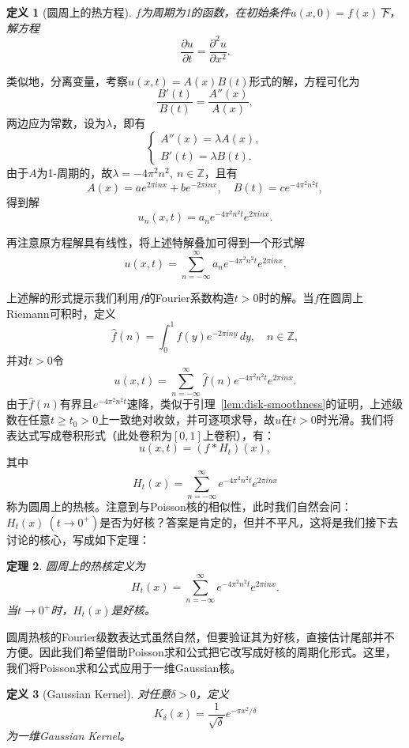 \documentclass[UTF8,zihao=5,linespread=1.34]{ctexart}
\theoremstyle{cnplain}
\newtheorem{theorem}{定理}[section]
\newtheorem{definition}[theorem]{定义}
\theoremstyle{cnremark}
\begin{document}
\begin{definition}[圆周上的热方程]
$f$为周期为1的函数，在初始条件$u(x,0) = f(x)$下，解方程
\[
\frac{\partial u}{\partial t} = \frac{\partial^{2}u}{\partial x^{2}}.
\tag{H}\label{eq:circle-heat}
\]
\end{definition}

类似地，分离变量，考察$u(x,t) = A(x)B(t)$形式的解，方程可化为
\[
\frac{B'(t)}{B(t)} = \frac{A''(x)}{A(x)},
\]
两边应为常数，设为$\lambda$，即有
\[
\begin{cases}
A''(x) = \lambda A(x), \\
B'(t) = \lambda B(t).
\end{cases}
\]
由于$A$为1-周期的，故$\lambda = -4\pi^{2}n^{2},\ n \in \mathbb{Z}$，且有
\[
A(x) = a e^{2\pi inx} + b e^{-2\pi inx},\quad B(t) = c e^{-4\pi^{2}n^{2}t},
\]
得到解
\[
u_n(x,t) = a_n e^{-4\pi^{2}n^{2}t} e^{2\pi inx}.
\]

再注意原方程解具有线性，将上述特解叠加可得到一个形式解
\[
u(x,t) = \sum_{n=-\infty}^{\infty} a_n e^{-4\pi^{2}n^{2}t} e^{2\pi inx}.
\]

上述解的形式提示我们利用$f$的Fourier系数构造$t>0$时的解。当$f$在圆周上Riemann可积时，定义
\[
\widehat{f}(n) = \int_{0}^{1} f(y)e^{-2\pi iny}\,dy,
\quad n \in \mathbb{Z},
\]
并对$t>0$令
\[
u(x,t) = \sum_{n=-\infty}^{\infty} \widehat{f}(n) e^{-4\pi^{2}n^{2}t} e^{2\pi inx}.
\]
由于$\widehat{f}(n)$有界且$e^{-4\pi^{2}n^{2}t}$速降，类似于引理~\ref{lem:disk-smoothness}的证明，上述级数在任意$t \geq t_{0}>0$上一致绝对收敛，并可逐项求导，故$u$在$t>0$时光滑。我们将表达式写成卷积形式（此处卷积为$[0,1]$上卷积），有：
\[
u(x,t) = (f * H_t)(x),
\]
其中
\[
H_t(x) = \sum_{n=-\infty}^{\infty} e^{-4\pi^{2}n^{2}t} e^{2\pi inx}
\]
称为圆周上的热核。注意到与Poisson核的相似性，此时我们自然会问：$H_t(x)\ (t \rightarrow 0^{+})$是否为好核？答案是肯定的，但并不平凡，这将是我们接下去讨论的核心，写成如下定理：

\begin{theorem}\label{thm:heat-kernel-good}
圆周上的热核定义为
\[
H_t(x) = \sum_{n=-\infty}^{\infty} e^{-4\pi^{2}n^{2}t} e^{2\pi inx}.
\]
当$t \rightarrow 0^{+}$时，$H_t(x)$是好核。
\end{theorem}

圆周热核的Fourier级数表达式虽然自然，但要验证其为好核，直接估计尾部并不方便。因此我们希望借助Poisson求和公式把它改写成好核的周期化形式。这里，我们将Poisson求和公式应用于一维Gaussian核。

\begin{definition}[Gaussian Kernel]
对任意$\delta > 0$，定义
\[
K_{\delta}(x) = \frac{1}{\sqrt{\delta}} e^{-\pi x^{2}/\delta}
\]
为一维Gaussian Kernel。
\end{definition}
\end{document}
